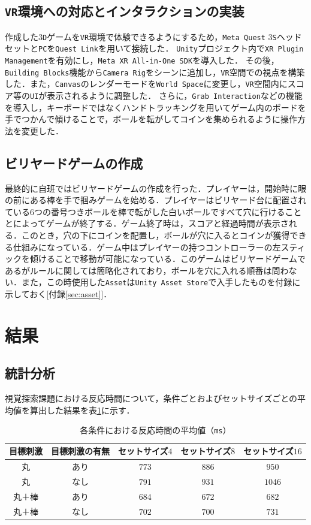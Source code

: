\documentclass[paper=a4, fontsize=10pt]{jlreq}
\begin{document}
\subsection{\texttt{VR}環境への対応とインタラクションの実装}
作成した$3$\texttt{D}ゲームを\texttt{VR}環境で体験できるようにするため，\texttt{Meta Quest} $3$\texttt{S}ヘッドセットと\texttt{PC}を\texttt{Quest Link}を用いて接続した．
\texttt{Unity}プロジェクト内で\texttt{XR Plugin Management}を有効にし，\texttt{Meta XR All-in-One SDK}を導入した．
その後，\texttt{Building Blocks}機能から\texttt{Camera Rig}をシーンに追加し，\texttt{VR}空間での視点を構築した．また，\texttt{Canvas}のレンダーモードを\texttt{World Space}に変更し，\texttt{VR}空間内にスコア等の\texttt{UI}が表示されるように調整した．
さらに，\texttt{Grab Interaction}などの機能を導入し，キーボードではなくハンドトラッキングを用いてゲーム内のボードを手でつかんで傾けることで，ボールを転がしてコインを集められるように操作方法を変更した．

\subsection{ビリヤードゲームの作成}
最終的に自班ではビリヤードゲームの作成を行った．プレイヤーは，開始時に眼の前にある棒を手で掴みゲームを始める．プレイヤーはビリヤード台に配置されている$6$つの番号つきボールを棒で転がした白いボールですべて穴に行けることとによってゲームが終了する．ゲーム終了時は，スコアと経過時間が表示される．このとき，穴の下にコインを配置し，ボールが穴に入るとコインが獲得できる仕組みになっている．ゲーム中はプレイヤーの持つコントローラーの左スティックを傾けることで移動が可能になっている．このゲームはビリヤードゲームであるがルールに関しては簡略化されており，ボールを穴に入れる順番は問わない．また，この時使用した\texttt{Asset}は\texttt{Unity Asset Store}で入手したものを付録に示しておく[付録\ref{sec:asset}]．

\section{結果}

\subsection{統計分析}
視覚探索課題における反応時間について，条件ごとおよびセットサイズごとの平均値を算出した結果を表\ref{tab:result_mean}に示す．

\begin{table}[htbp]
  \centering
  \caption{各条件における反応時間の平均値（\texttt{ms}）}
  \label{tab:result_mean}
  \begin{tabular}{|c|c||c|c|c|}
    \hline
    目標刺激 & 目標刺激の有無 & セットサイズ$4$ & セットサイズ$8$ & セットサイズ$16$ \\ \hline \hline
    丸 & あり & $773$ & $886$ & $950$ \\ \hline
    丸 & なし & $791$ & $931$ & $1046$ \\ \hline
    丸＋棒 & あり & $684$ & $672$ & $682$ \\ \hline
    丸＋棒 & なし & $702$ & $700$ & $731$ \\ \hline
  \end{tabular}
\end{table}
\end{document}
